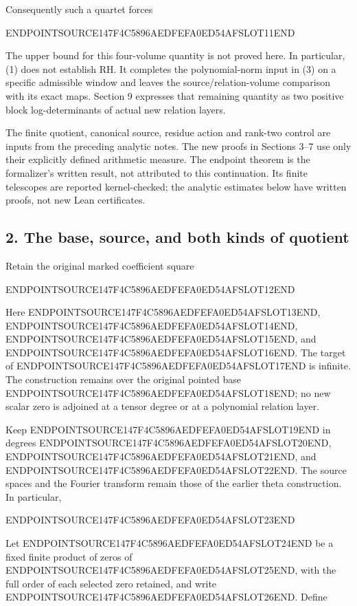 Consequently such a quartet forces

ENDPOINTSOURCE147F4C5896AEDFEFA0ED54AFSLOT11END

The upper bound for this four-volume quantity is not proved here. In particular, (1) does not establish RH. It completes the polynomial-norm input in (3) on a specific admissible window and leaves the source/relation-volume comparison with its exact maps. Section 9 expresses that remaining quantity as two positive block log-determinants of actual new relation layers.

The finite quotient, canonical source, residue action and rank-two control are inputs from the preceding analytic notes. The new proofs in Sections 3--7 use only their explicitly defined arithmetic measure. The endpoint theorem is the formalizer's written result, not attributed to this continuation. Its finite telescopes are reported kernel-checked; the analytic estimates below have written proofs, not new Lean certificates.

\subsection{2. The base, source, and both kinds of quotient}\label{endpoint-arithmetic_original--the-base-source-and-both-kinds-of-quotient}

Retain the original marked coefficient square

ENDPOINTSOURCE147F4C5896AEDFEFA0ED54AFSLOT12END

Here ENDPOINTSOURCE147F4C5896AEDFEFA0ED54AFSLOT13END, ENDPOINTSOURCE147F4C5896AEDFEFA0ED54AFSLOT14END, ENDPOINTSOURCE147F4C5896AEDFEFA0ED54AFSLOT15END, and ENDPOINTSOURCE147F4C5896AEDFEFA0ED54AFSLOT16END. The target of ENDPOINTSOURCE147F4C5896AEDFEFA0ED54AFSLOT17END is infinite. The construction remains over the original pointed base ENDPOINTSOURCE147F4C5896AEDFEFA0ED54AFSLOT18END; no new scalar zero is adjoined at a tensor degree or at a polynomial relation layer.

Keep ENDPOINTSOURCE147F4C5896AEDFEFA0ED54AFSLOT19END in degrees ENDPOINTSOURCE147F4C5896AEDFEFA0ED54AFSLOT20END, ENDPOINTSOURCE147F4C5896AEDFEFA0ED54AFSLOT21END, and ENDPOINTSOURCE147F4C5896AEDFEFA0ED54AFSLOT22END. The source spaces and the Fourier transform remain those of the earlier theta construction. In particular,

ENDPOINTSOURCE147F4C5896AEDFEFA0ED54AFSLOT23END

Let ENDPOINTSOURCE147F4C5896AEDFEFA0ED54AFSLOT24END be a fixed finite product of zeros of ENDPOINTSOURCE147F4C5896AEDFEFA0ED54AFSLOT25END, with the full order of each selected zero retained, and write ENDPOINTSOURCE147F4C5896AEDFEFA0ED54AFSLOT26END. Define

